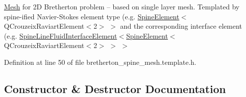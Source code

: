 \hyperlink{classoomph_1_1Mesh}{Mesh} for 2D Bretherton problem -- based on single layer mesh. Templated by spine-\/ified Navier-\/\+Stokes element type (e.\+g. \hyperlink{classoomph_1_1SpineElement}{Spine\+Element}$<$Q\+Crouzeix\+Raviart\+Element$<$2$>$ $>$ and the corresponding interface element (e.\+g. \hyperlink{classoomph_1_1SpineLineFluidInterfaceElement}{Spine\+Line\+Fluid\+Interface\+Element}$<$\hyperlink{classoomph_1_1SpineElement}{Spine\+Element}$<$Q\+Crouzeix\+Raviart\+Element$<$2$>$ $>$ $>$ 

Definition at line 50 of file bretherton\+\_\+spine\+\_\+mesh.\+template.\+h.



\subsection{Constructor \& Destructor Documentation}
\mbox{\label{classoomph_1_1BrethertonSpineMesh_a0e9c404141ee65b000ab4d1fdc4f11da}} 
